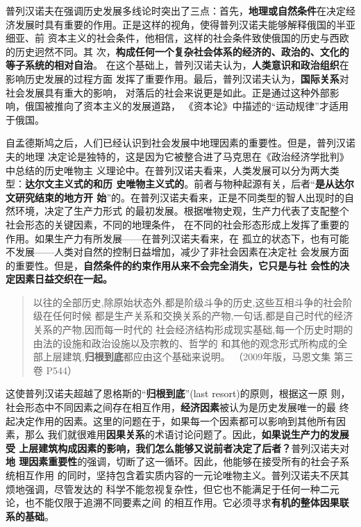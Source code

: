 普列汉诺夫在强调历史发展多线论时突出了三点：首先，\textbf{地理或自然条件}在决定经
济发展时具有重要的作用。正是这样的视角，使得普列汉诺夫能够解释俄国的半亚细亚、前
资本主义的社会条件，他相信，这样的社会条件致使俄国的历史与西欧的历史迥然不同。其
次，\textbf{构成任何一个复杂社会体系的经济的、政治的、文化的等子系统的相对自治}。
在这个基础上，普列汉诺夫认为，\textbf{人类意识和政治组织}在影响历史发展的过程方面
发挥了重要作用。最后，普列汉诺夫认为，\textbf{国际关系}对社会发展具有重大的影响，
对落后的社会来说更是如此。正是通过这种外部影响，俄国被推向了资本主义的发展道路，
《资本论》中描述的“运动规律”才适用于俄国。

自孟德斯鸠之后，人们已经认识到社会发展中地理因素的重要性。但是，普列汉诺夫的地理
决定论是独特的，这是因为它被整合进了马克思在《政治经济学批判》中总结的历史唯物主
义理论中。在普列汉诺夫看来，人类发展可以分为两大类型：\textbf{达尔文主义式的和历
  史唯物主义式的}。前者与物种起源有关，后者“\textbf{是从达尔文研究结束的地方开
  始}”的。在普列汉诺夫看来，正是不同类型的智人出现时的自然环境，决定了生产力形式
的最初发展。根据唯物史观，生产力代表了支配整个社会形态的关键因素，不同的地理条件，
在不同的社会形态形成上发挥了重要的作用。如果生产力有所发展——在普列汉诺夫看来，在
孤立的状态下，也有可能不发展——人类对自然的控制日益增加，减少了非社会因素在决定社
会发展方面的重要性。但是，\textbf{自然条件的约束作用从来不会完全消失，它只是与社
  会性的决定因素日益交织在一起。}

\begin{quotation}
  以往的全部历史,除原始状态外,都是阶级斗争的历史,这些互相斗争的社会阶级在任何时候
  都是生产关系和交换关系的产物,一句话,都是自己时代的经济关系的产物,因而每一时代的
  社会经济结构形成现实基础,每一个历史时期的由法的设施和政治设施以及宗教的、哲学的
  和其他的观念形式所构成的全部上层建筑,\textbf{归根到底}都应由这个基础来说明。
  （2009年版，马恩文集 第三卷 P544）
\end{quotation}
这使普列汉诺夫超越了恩格斯的“\textbf{归根到底}”(last resort)的原则，根据这一原
则，社会形态中不同因素之间存在相互作用，\textbf{经济因素}被认为是历史发展唯一的最
终起决定作用的因素。这里的问题在于，如果每一个因素都可以影响到其他所有因素，那么
我们就很难用\textbf{因果关系}的术语讨论问题了。因此，\textbf{如果说生产力的发展受
  上层建筑构成因素的影响，我们怎么能够又说前者决定了后者？}普列汉诺夫对\textbf{地
  理因素重要性}的强调，切断了这一循环。因此，他能够在接受所有的社会子系统相互作用
的同时，坚持包含着实质内容的一元论唯物主义。普列汉诺夫不厌其烦地强调，尽管发达的
科学不能忽视复杂性，但它也不能满足于任何一种二元论，也不能仅限于追溯不同要素之间
的相互作用。它必须寻求\textbf{有机的整体因果联系的基础}。


